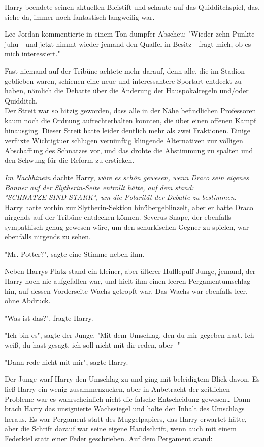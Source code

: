 {Harry beendete seinen aktuellen Bleistift und schaute auf das Quidditchspiel, das, siehe da, immer noch fantastisch langweilig war.

Lee Jordan kommentierte in einem Ton dumpfer Abscheu: "Wieder zehn Punkte - juhu - und jetzt nimmt wieder jemand den Quaffel in Besitz - fragt mich, ob es mich interessiert."

Fast niemand auf der Tribüne achtete mehr darauf, denn alle, die im Stadion geblieben waren, schienen eine neue und interessantere Sportart entdeckt zu haben, nämlich die Debatte über die Änderung der Hauspokalregeln und/oder Quidditch.\\ Der Streit war so hitzig geworden, dass alle in der Nähe befindlichen Professoren kaum noch die Ordnung aufrechterhalten konnten, die über einen offenen Kampf hinausging. Dieser Streit hatte leider deutlich mehr als zwei Fraktionen. Einige verflixte Wichtigtuer schlugen vernünftig klingende Alternativen zur völligen Abschaffung des Schnatzes vor, und das drohte die Abstimmung zu spalten und den Schwung für die Reform zu ersticken.

\emph{Im Nachhinein} dachte Harry, \emph{wäre es schön gewesen, wenn Draco sein eigenes Banner auf der Slytherin-Seite entrollt hätte, auf dem stand:\\ "SCHNATZE SIND STARK", um die Polarität der Debatte zu bestimmen.}\\ Harry hatte vorhin zur Slytherin-Sektion hinübergeblinzelt, aber er hatte Draco nirgends auf der Tribüne entdecken können. Severus Snape, der ebenfalls sympathisch genug gewesen wäre, um den schurkischen Gegner zu spielen, war ebenfalls nirgends zu sehen.

"Mr. Potter?", sagte eine Stimme neben ihm.

Neben Harrys Platz stand ein kleiner, aber älterer Hufflepuff-Junge, jemand, der Harry noch nie aufgefallen war, und hielt ihm einen leeren Pergamentumschlag hin, auf dessen Vorderseite Wachs getropft war. Das Wachs war ebenfalls leer, ohne Abdruck.

"Was ist das?", fragte Harry.

"Ich bin es", sagte der Junge. "Mit dem Umschlag, den du mir gegeben hast. Ich weiß, du hast gesagt, ich soll nicht mit dir reden, aber -"

"Dann rede nicht mit mir", sagte Harry.

Der Junge warf Harry den Umschlag zu und ging mit beleidigtem Blick davon. Es ließ Harry ein wenig zusammenzucken, aber in Anbetracht der zeitlichen Probleme war es wahrscheinlich nicht die falsche Entscheidung gewesen… Dann brach Harry das unsignierte Wachssiegel und holte den Inhalt des Umschlags heraus. Es war Pergament statt des Muggelpapiers, das Harry erwartet hätte, aber die Schrift darauf war seine eigene Handschrift, wenn auch mit einem Federkiel statt einer Feder geschrieben. Auf dem Pergament stand:

}
